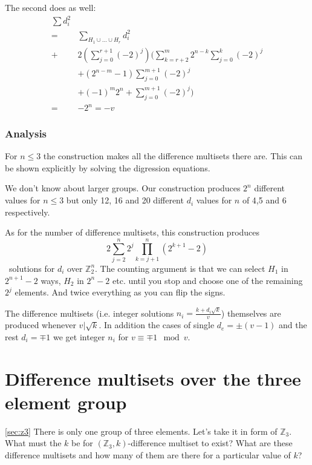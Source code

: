         The second does as well:
        \begin{equation}
            \begin{split}
                \sum d_i^2 & \\
                = & \sum\limits_{H_1 \cup \ldots \cup H_r} d_i^2 \\
                + & 2 \left(\sum\limits_{j=0}^{r+1} (-2)^j \right) 
                 \Bigg(
                    \sum\limits_{k=r+2}^{m} 2^{n-k} \sum\limits_{j=0}^k (-2)^j \\
                   & + (2^{n-m}-1)\sum\limits_{j=0}^{m+1} (-2)^j \\
                   & + (-1)^m 2^n + \sum\limits_{j=0}^{m+1} (-2)^j
                 \Bigg) \\
                = & - 2^n = -v
            \end{split}
        \end{equation}
    
    \subsubsection{Analysis}
        For $n \leq 3$ the construction makes all the difference multisets there are. This can be shown explicitly by solving the digression equations.
        
        We don't know about larger groups. Our construction produces $2^n$ different values for $n \leq 3$ but only 12, 16 and 20 different $d_i$ values for $n$ of 4,5 and 6 respectively.
        
        As for the number of difference multisets, this construction produces
        \begin{equation}
            2 \sum\limits_{j=2}^n 2^j \prod\limits_{k=j+1}^n (2^{k+1}-2)
        \end{equation}\
        solutions for $d_i$ over $\mathbb Z_2^n$. The counting argument is that we can select $H_1$ in $2^{n+1}-2$ ways, $H_2$ in $2^n-2$ etc. until you stop and choose one of the remaining $2^j$ elements. And twice everything as you can flip the signs.
        
        The difference multisets (i.e. integer solutions $n_i=\frac{k+d_i \sqrt k}v$) themselves are produced whenever $v | \sqrt k$. In addition the cases of single $d_e = \pm (v-1)$ and the rest $d_i = \mp 1$ we get integer $n_i$ for $v \equiv \mp 1 \mod v$.
        
\section{Difference multisets over the three element group}
    \ref{sec:z3}
    There is only one group of three elements. Let's take it in form of $\mathbb Z_3$. What must the $k$ be for $(\mathbb Z_3,k)$-difference multiset to exist? What are these difference multisets and how many of them are there for a particular value of $k$?

